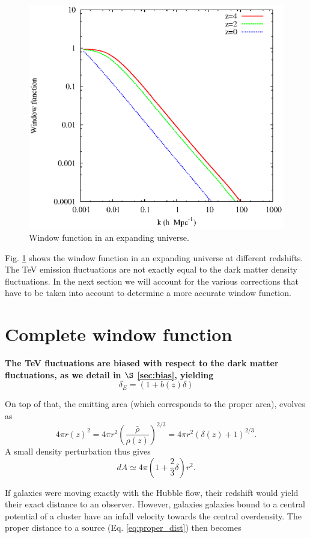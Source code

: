 \documentclass[twocolumns]{emulateapj}
\newcommand\ALc[1]{{\color{red} \bf #1}} %
\begin{document}
{\begin{figure}[h]
  \centering
  \includegraphics[width = .45\textwidth ]{window_nobiases}
  \caption{Window function in an expanding universe.}
  \label{fig:window_nobiases}
\end{figure}

Fig. \ref{fig:window_nobiases} shows the window function in an expanding universe at different redshifts.  %
The TeV emission fluctuations are not exactly equal to the dark matter density fluctuations. In the next section we will account for the various corrections that have to be taken into account to determine a more accurate window function.


\section{Complete window function}
 \ALc{
The TeV fluctuations are biased with respect to the dark matter fluctuations, as we detail in $\S$ \ref{sec:bias}, yielding 
\begin{equation}
  \delta_E=(1+b(z)\delta)
\label{eq:bias}
\end{equation}

On top of that, the emitting area (which corresponds to the proper area), evolves as
  \begin{equation}
    \label{eq:emitting_area}
4\pi r(z)^2=4\pi r^2\left(\frac{\bar{\rho}}{\rho(z)}\right)^{2/3}=4\pi r^2(\delta(z)+1)^{2/3}.
  \end{equation}
A small density perturbation thus gives
\begin{equation}
  \label{eq:pert_area}
dA\simeq 4\pi \left(1+\frac{2}{3}\delta\right)r^2.
\end{equation}

If galaxies were moving exactly with the Hubble flow, their redshift would yield their exact distance to an observer. However, galaxies galaxies bound to a central potential of a cluster have an infall velocity towards the central overdensity. The proper distance to a source  (Eq. \ref{eq:proper_dist}) then becomes

}}
\end{document}
